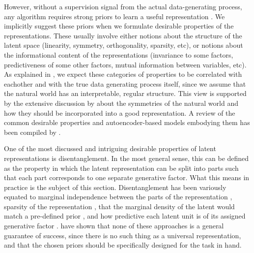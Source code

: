 \documentclass[../thesis.tex]{subfiles}
\begin{document}
However, without a supervision signal from the actual data-generating process, any algorithm requires strong priors to learn a useful representation \citet{locatelloChallengingCommonAssumptions2019}. We implicitly suggest these priors when we formulate desirable properties of the representations. These usually involve either notions about the structure of the latent space (linearity, symmetry, orthogonality, sparsity, etc), or notions about the informational content of the representations (invariance to some factors, predictiveness of some other factors, mutual information between variables, etc). As explained in \citet{bengioRepresentationLearningReview2014}, we expect these categories of properties to be correlated with eachother and with the true data generating process itself, since we assume that the natural world has an interpretable, regular structure. This view is supported by the extensive discussion by \citet{higginsDefinitionDisentangledRepresentations2018} about the symmetries of the natural world and how they should be incorporated into a good representation. A review of the common desirable properties and autoencoder-based models embodying them has been compiled by \citet{tschannenRecentAdvancesAutoencoderBased2018}.

One of the most discussed and intriguing desirable properties of latent representations is disentanglement. In the most general sense, this can be defined as the property in which the latent representation can be split into parts such that each part corresponds to one separate generative factor. What this means in practice is the subject of this section. Disentanglement has been variously equated to marginal independence between the parts of the representation \citet{ver2014discovering, kim2018disentangling, chen2018isolating, kumar2017variational}, sparsity of the representation \citep{mathieu2019disentangling}, that the marginal density of the latent would match a pre-defined prior \citep{tolstikhin2017wasserstein, makhzani2015adversarial}, and how predictive each latent unit is of its assigned generative factor \citep{higgins2016beta, kim2017learning}. \citet{locatelloChallengingCommonAssumptions2019} have shown that none of these approaches is a general guarantee of success, since there is no such thing as a universal representation, and that the chosen priors should be specifically designed for the task in hand.
\end{document}
